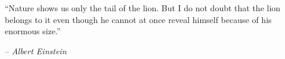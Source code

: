 \thispagestyle{empty}

\vspace*{0.4\textwidth}

{\large
``Nature shows us only the tail of the lion. But I do not doubt that the lion belongs to it even though he cannot at once reveal himself because of his enormous size.'' \\
\vspace{-2mm}

\begin{flushright}
 -- \emph{Albert Einstein}
\end{flushright}
}

\vfill